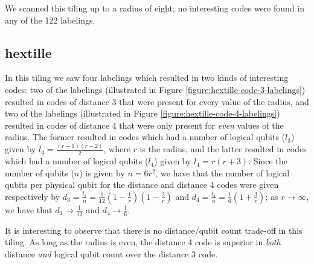 \documentclass{amsbook}
\theoremstyle{plain}
\theoremstyle{definition}
\theoremstyle{remark}
\newcommand{\paren}[1]{\left(#1\right)}
\begin{document}
We scanned this tiling up to a radius of eight;  no interesting codes were found in any of the 122 labelings.
\subsection{hextille}

In this tiling we saw four labelings which resulted in two kinds of interesting codes:  two of the labelings (illustrated in Figure \ref{figure:hextille-code-3-labelings}) resulted in codes of distance 3 that were present for every value of the radius, and two of the labelings (illustrated in Figure \ref{figure:hextille-code-4-labelings}) resulted in codes of distance 4 that were only present for \emph{even} values of the radius.  The former resulted in codes which had a number of logical qubits ($l_3$) given by $l_3=\frac{(r-1)(r-2)}{2}$, where $r$ is the radius, and the latter resulted in codes which had a number of logical qubits ($l_4$) given by $l_4=r(r+3)$.  Since the number of qubits ($n$) is given by $n=6r^2$, we have that the number of logical qubits per physical qubit for the distance and distance 4 codes were given respectively by $d_3=\frac{l_3}{n}=\frac{1}{12}\paren{1-\frac{1}{r}}\paren{1-\frac{2}{r}}$ and $d_4=\frac{l_4}{n}=\frac{1}{6}\paren{1+\frac{3}{r}}$;  as $r\to\infty$, we have that $d_3\to\frac{1}{12}$ and $d_4\to\frac{1}{6}$.

It is interesting to observe that there is no distance/qubit count trade-off in this tiling.  As long as the radius is even, the distance 4 code is superior in \emph{both} distance \emph{and} logical qubit count over the distance 3 code.
\end{document}
